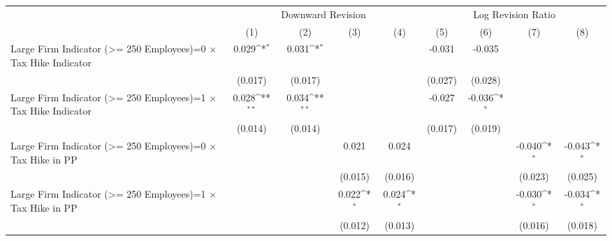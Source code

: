 {
\def\sym#1{\ifmmode^{#1}\else\(^{#1}\)\fi}
\begin{tabular}{l*{8}{c}}
\toprule
                    &\multicolumn{4}{c}{Downward Revision}                                                  &\multicolumn{4}{c}{Log Revision Ratio}                                                 \\\cmidrule(lr){2-5}\cmidrule(lr){6-9}
                    &\multicolumn{1}{c}{(1)}         &\multicolumn{1}{c}{(2)}         &\multicolumn{1}{c}{(3)}         &\multicolumn{1}{c}{(4)}         &\multicolumn{1}{c}{(5)}         &\multicolumn{1}{c}{(6)}         &\multicolumn{1}{c}{(7)}         &\multicolumn{1}{c}{(8)}         \\
\midrule
Large Firm Indicator (>= 250 Employees)=0 $\times$ Tax Hike Indicator&       0.029\sym{*}  &       0.031\sym{*}  &                     &                     &      -0.031         &      -0.035         &                     &                     \\
                    &     (0.017)         &     (0.017)         &                     &                     &     (0.027)         &     (0.028)         &                     &                     \\
Large Firm Indicator (>= 250 Employees)=1 $\times$ Tax Hike Indicator&       0.028\sym{**} &       0.034\sym{**} &                     &                     &      -0.027         &      -0.036\sym{*}  &                     &                     \\
                    &     (0.014)         &     (0.014)         &                     &                     &     (0.017)         &     (0.019)         &                     &                     \\
Large Firm Indicator (>= 250 Employees)=0 $\times$ Tax Hike in PP&                     &                     &       0.021         &       0.024         &                     &                     &      -0.040\sym{*}  &      -0.043\sym{*}  \\
                    &                     &                     &     (0.015)         &     (0.016)         &                     &                     &     (0.023)         &     (0.025)         \\
Large Firm Indicator (>= 250 Employees)=1 $\times$ Tax Hike in PP&                     &                     &       0.022\sym{*}  &       0.024\sym{*}  &                     &                     &      -0.030\sym{*}  &      -0.034\sym{*}  \\
                    &                     &                     &     (0.012)         &     (0.013)         &                     &                     &     (0.016)         &     (0.018)         \\

\end{tabular}}
